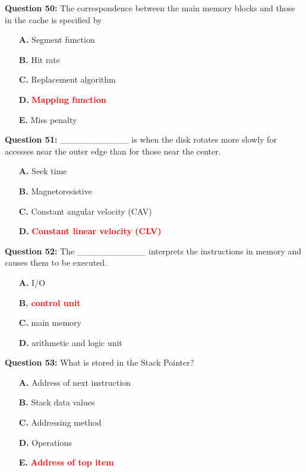 \documentclass[12pt,a4paper]{article}
\begin{document}
\vspace{0.5cm}

\textbf{Question 50:} The correspondence between the main memory blocks and those in the cache is specified by

\begin{itemize}
    \item[\textbf{A.}] Segment function
    \item[\textbf{B.}] Hit rate
    \item[\textbf{C.}] Replacement algorithm
    \item[\textbf{D.}] \textcolor{red}{\textbf{Mapping function}}
    \item[\textbf{E.}] Miss penalty
\end{itemize}

\vspace{0.5cm}

\textbf{Question 51:} ___________ is when the disk rotates more slowly for accesses near the outer edge than for those near the center.

\begin{itemize}
    \item[\textbf{A.}] Seek time
    \item[\textbf{B.}] Magnetoresistive
    \item[\textbf{C.}] Constant angular velocity (CAV)
    \item[\textbf{D.}] \textcolor{red}{\textbf{Constant linear velocity (CLV)}}
\end{itemize}

\vspace{0.5cm}

\textbf{Question 52:} The ___________ interprets the instructions in memory and causes them to be executed.

\begin{itemize}
    \item[\textbf{A.}] I/O
    \item[\textbf{B.}] \textcolor{red}{\textbf{control unit}}
    \item[\textbf{C.}] main memory
    \item[\textbf{D.}] arithmetic and logic unit
\end{itemize}

\vspace{0.5cm}

\textbf{Question 53:} What is stored in the Stack Pointer?

\begin{itemize}
    \item[\textbf{A.}] Address of next instruction
    \item[\textbf{B.}] Stack data values
    \item[\textbf{C.}] Addressing method
    \item[\textbf{D.}] Operations
    \item[\textbf{E.}] \textcolor{red}{\textbf{Address of top item}}
\end{itemize}
\end{document}
